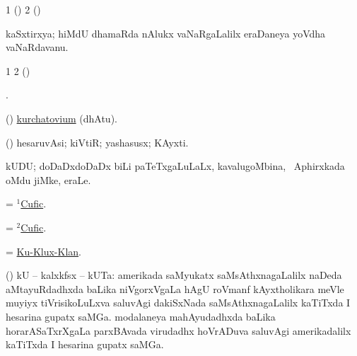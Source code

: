 \bentry
{}
\gl{\saMkiSx}
\bmng
\bnum
\num{1} (\ame)  
\num{2} (\birx)  
\enum
\emng
\eentry

\bentry
{}
\gl{\nA}
\bmng
kaSxtirxya; hiMdU dhamaRda nAlukx vaNaRgaLalilx eraDaneya yoVdha vaNaRdavanu. 
\emng
\eentry

\bentry
{}
\gl{\saMkiSx}
\bmng
{} 
\emng
\eentry

\bentry
{}
\gl{\saMkiSx}
\bmng
\bnum
\num{1}  
\num{2} (\birx)  
\enum
\emng
\eentry

\bentry
{}
\gl{\saMkiSx}
\bmng
{} 
\emng
\eentry

\bentry
{}
\gl{\saMkiSx}
\bmng
{}. 
\emng
\eentry

\bentry
{}
\gl{\saMkeV}
\bmng
(\ravi)  \hyperlink{kurchatovium}{kurchatovium} (dhAtu). 
\emng
\eentry

\bentry
{}
\gl{\nA}
\bmng
(\AmA) hesaruvAsi; kiVtiR; yashasusx; KAyxti. 
\emng
\eentry

\bentry
{}
\gl{\nA}
\bmng
kUDU; doDaDxdoDaDx biLi paTeTxgaLuLaLx, kavalugoMbina, \da\ Aphirxkada oMdu jiMke, eraLe.  
\emng
\eentry

\bentry
{}
\gl{\nA}
\bmng
= \hyperref{kandict_c.pdf}{C}{Cufic(1)}{$^1$Cufic}. 
\emng
\eentry

\bentry
{}
\gl{\gu}
\bmng
= \hyperref{kandict_c.pdf}{C}{Cufic(2)}{$^2$Cufic}. 
\emng
\eentry

\bentry
{}
\gl{\nA}
\bmng
 = \hyperlink{Ku-Klux-Klan}{Ku-Klux-Klan}. 
\emng
\eentry

\bentry
{}
\gl{\nA}
\bmng
(\ame) kU -- kalxkfsx -- kUTa: 
\banum
{} amerikada saMyukatx saMsAthxnagaLalilx naDeda aMtayuRdadhxda baLika niVgorxVgaLa hAgU roVmanf kAyxtholikara meVle muyiyx tiVrisikoLuLxva saluvAgi dakiSxNada saMsAthxnagaLalilx kaTiTxda I hesarina gupatx saMGa. 
 modalaneya mahAyudadhxda baLika horarASaTxrXgaLa parxBAvada virudadhx hoVrADuva saluvAgi amerikadalilx kaTiTxda I hesarina gupatx saMGa. 
\eanum
\emng
\eentry

